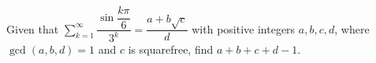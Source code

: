 Given that $\displaystyle\sum_{k=1}^{\infty}\dfrac{\sin\dfrac{k\pi}{6}}{3^k}=\dfrac{a+b\sqrt c}{d}$ with positive integers $a,b,c,d$, where $\gcd(a,b,d)=1$ and $c$ is squarefree, find $a+b+c+d-1$.
